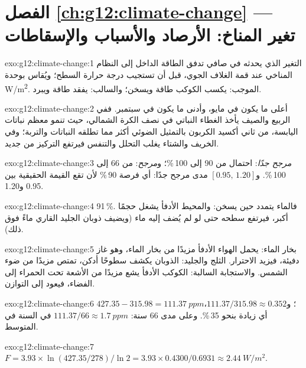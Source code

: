 \section*{الفصل \ref{ch:g12:climate-change} --- تغير المناخ: الأرصاد والأسباب والإسقاطات}

\begin{solution}{exo:g12:climate-change:1}
التغير الذي يحدثه في صافي تدفق الطاقة الداخل إلى النظام المناخي
عند قمة الغلاف الجوي، قبل أن تستجيب درجة حرارة السطح؛ ويُقاس
بوحدة \unit{W/m^2}. الموجب: يكسب الكوكب طاقة ويسخن؛
والسالب: يفقد طاقة ويبرد.
\end{solution}

\begin{solution}{exo:g12:climate-change:2}
أعلى ما يكون في مايو، وأدنى ما يكون في سبتمبر. ففي الربيع والصيف يأخذ الغطاء النباتي
في نصف الكرة الشمالي، حيث تنمو معظم نباتات اليابسة، من ثاني أكسيد الكربون
بالتمثيل الضوئي أكثر مما تطلقه النباتات والتربة؛ وفي الخريف
والشتاء يغلب التحلل والتنفس فيرتفع التركيز من جديد.
\end{solution}

\begin{solution}{exo:g12:climate-change:3}
\emph{مرجح جدًا}: احتمال من 90 إلى 100\,\%؛ و\emph{مرجح}: من 66 إلى
100\,\%. و$[0.95 \text{, } 1.20]$ مدى مرجح جدًا: أي فرصة 90\,\% لأن
تقع القيمة الحقيقية بين 0.95 و1.20.
\end{solution}

\begin{solution}{exo:g12:climate-change:4}
91\,\%. فالماء يتمدد حين يسخن: والمحيط الأدفأ يشغل حجمًا أكبر، فيرتفع
سطحه حتى لو لم يُضف إليه ماء (ويضيف ذوبان الجليد القاري ماءً فوق
ذلك).
\end{solution}

\begin{solution}{exo:g12:climate-change:5}
بخار الماء: يحمل الهواء الأدفأ مزيدًا من بخار الماء، وهو غاز دفيئة، فيزيد
الاحترار. الثلج والجليد: الذوبان يكشف سطوحًا أدكن، تمتص
مزيدًا من ضوء الشمس. والاستجابة السالبة: الكوكب الأدفأ يشع مزيدًا من الأشعة تحت الحمراء
إلى الفضاء، فيعود إلى التوازن.
\end{solution}

\begin{solution}{exo:g12:climate-change:6}
$427.35 - 315.98 = \qty{111.37}{ppm}$؛ و$111.37/315.98 \approx 0.352$، أي
زيادة بنحو 35\,\%. وعلى مدى 66 سنة: $111.37/66 \approx
\qty{1.7}{ppm}$ في السنة في المتوسط.
\end{solution}

\begin{solution}{exo:g12:climate-change:7}
$F = 3.93 \times \ln(427.35/278)/\ln 2 = 3.93 \times 0.4300/0.6931 \approx
\qty{2.44}{W/m^2}$.
\end{solution}

